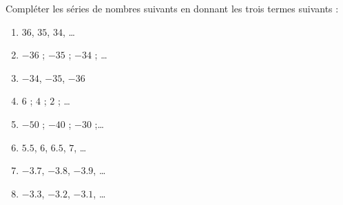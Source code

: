 
\begin{exercice}\label{exo2smath-0054}

    Compléter les séries de nombres suivants en donnant les trois termes suivants :
    \begin{enumerate}
        \item
            \( 36\), \( 35\), \( 34\), \ldots
        \item
            $-36$ ; $-35$ ; $-34$ ; \ldots
        \item
            \( -34\), \( -35\), \( -36\)
\item
 $6$ ; $4$ ; $2$ ; \ldots
\item
 $-50$ ; $-40$ ; $-30$ ;\ldots
            \item
                \( 5.5\), \( 6\), \( 6.5\), \( 7\), \ldots
            \item
                \( -3.7\), \( -3.8\), \( -3.9\), \ldots
            \item
                \( -3.3\), \( -3.2\),  \( -3.1\), \ldots
    \end{enumerate}

\end{exercice}
